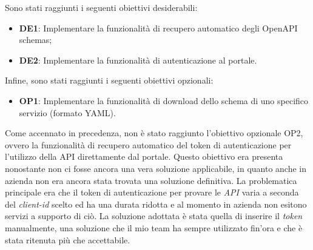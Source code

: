 Sono stati raggiunti i seguenti obiettivi desiderabili:
\begin{itemize}
  \item \textbf{DE1}:  Implementare la funzionalità di recupero automatico degli OpenAPI schemas;
  \item \textbf{DE2}: Implementare la funzionalità di autenticazione al portale.
\end{itemize}

Infine, sono stati raggiunti i seguenti obiettivi opzionali:
\begin{itemize}
  \item \textbf{OP1}: Implementare la funzionalità di download dello schema di uno specifico servizio (formato YAML).
\end{itemize}

Come accennato in precedenza, non è stato raggiunto l'obiettivo opzionale OP2, ovvero la funzionalità di recupero automatico del token di autenticazione per l'utilizzo della API direttamente dal portale.
Questo obiettivo era presenta nonostante non ci fosse ancora una vera soluzione applicabile, in quanto anche in azienda non era ancora stata trovata una soluzione definitiva.
La problematica principale era che il token di autenticazione per provare le \textit{API} varia a seconda del \textit{client-id} scelto ed ha una durata ridotta e al momento in azienda
non esitono servizi a supporto di ciò.
La soluzione adottata è stata quella di inserire il \textit{token} manualmente, una soluzione che il mio team ha sempre utilizzato fin'ora e che è stata ritenuta più che accettabile.

